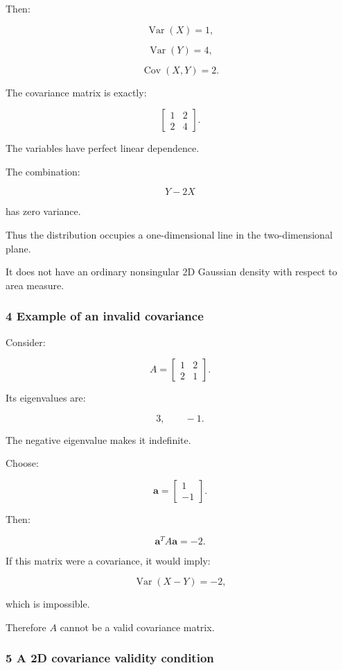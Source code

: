 Then:

\[
 \operatorname{Var}(X)=1,
\]

\[
 \operatorname{Var}(Y)=4,
\]

\[
 \operatorname{Cov}(X,Y)=2.
\]

The covariance matrix is exactly:

\[
 \begin{bmatrix} 1&2\\2&4 \end{bmatrix}.
\]

The variables have perfect linear dependence.

The combination:

\[
 Y-2X
\]

has zero variance.

Thus the distribution occupies a one-dimensional line in the two-dimensional plane.

It does not have an ordinary nonsingular 2D Gaussian density with respect to area measure.

\subsubsection{4 Example of an invalid covariance}\label{02-foundations-ii-ch024-example-of-an-invalid-covariance}

Consider:

\[
 \boxed{ A= \begin{bmatrix} 1&2\\ 2&1 \end{bmatrix} }.
\]

Its eigenvalues are:

\[
 3,\qquad-1.
\]

The negative eigenvalue makes it indefinite.

Choose:

\[
 \mathbf a= \begin{bmatrix} 1\\-1 \end{bmatrix}.
\]

Then:

\[
 \mathbf a^TA\mathbf a=-2.
\]

If this matrix were a covariance, it would imply:

\[
 \operatorname{Var}(X-Y)=-2,
\]

which is impossible.

Therefore \(A\) cannot be a valid covariance matrix.

\subsubsection{5 A 2D covariance validity condition}\label{02-foundations-ii-ch024-a-2d-covariance-validity-condition}

